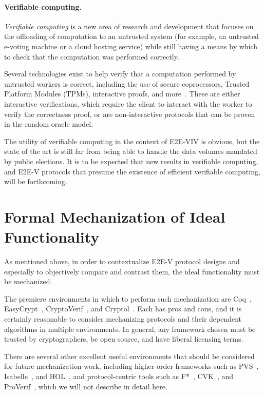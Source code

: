 \paragraph{Verifiable computing.} \emph{Verifiable computing} is a new
area of research and development that focuses on the offloading of
computation to an untrusted system (for example, an untrusted e-voting
machine or a cloud hosting service) while still having a means by
which to check that the computation was performed correctly.

Several technologies exist to help verify that a computation performed
by untrusted workers is correct, including the use of secure
coprocessors, Trusted Platform Modules (TPMs), interactive proofs, and
more~\cite{king2013trusted,perez2006vtpm,sparks2007security}. These
are either interactive verifications, which require the client to
interact with the worker to verify the correctness proof, or are
non-interactive protocols that can be proven in the random oracle
model.

The utility of verifiable computing in the context of E2E-VIV is
obvious, but the state of the art is still far from being able to
handle the data volumes mandated by public elections. It is to be
expected that new results in verifiable computing, and E2E-V protocols
that presume the existence of efficient verifiable computing, will be
forthcoming.

\section{Formal Mechanization of Ideal Functionality}
\label{sec:crypto_mechanization}

As mentioned above, in order to contextualize E2E-V protocol designs
and especially to objectively compare and contrast them, the ideal
functionality must be mechanized.

The premiere environments in which to perform such mechanization are
Coq~\cite{Coq}, EasyCrypt~\cite{EasyCrypt},
CryptoVerif~\cite{CryptoVerif}, and Cryptol~\cite{Cryptol}. Each has
pros and cons, and it is certainly reasonable to consider mechanizing
protocols and their dependent algorithms in multiple environments. In
general, any framework chosen must be trusted by cryptographers, be
open source, and have liberal licensing terms.

There are several other excellent useful environments that should be
considered for future mechanization work, including higher-order
frameworks such as PVS~\cite{PVS}, Isabelle~\cite{Isabelle}, and
HOL~\cite{HOL}, and protocol-centric tools such as F*~\cite{Fstar},
CVK~\cite{CVK}, and ProVerif~\cite{ProVerif}, which we will not
describe in detail here.

